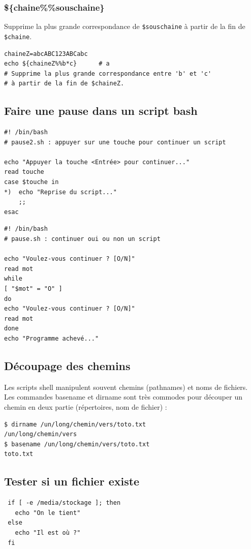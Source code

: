 \documentclass[a4paper,twoside]{article}
\begin{document}
\subsubsection{\$\{chaine\%\%souschaine\}}
Supprime la plus grande correspondance de \verb|$souschaine| à partir de la fin de \verb|$chaine|.

\begin{exemple}
\begin{verbatim}
chaineZ=abcABC123ABCabc
echo ${chaineZ%%b*c}      # a
# Supprime la plus grande correspondance entre 'b' et 'c'
# à partir de la fin de $chaineZ.
\end{verbatim}
\end{exemple}

\subsection{Faire une pause dans un script bash}
\begin{verbatim}
#! /bin/bash
# pause2.sh : appuyer sur une touche pour continuer un script

echo "Appuyer la touche <Entrée> pour continuer..."
read touche
case $touche in
*)	echo "Reprise du script..."
	;;
esac
\end{verbatim}

\begin{verbatim}
#! /bin/bash
# pause.sh : continuer oui ou non un script

echo "Voulez-vous continuer ? [O/N]"
read mot
while
[ "$mot" = "O" ]
do
echo "Voulez-vous continuer ? [O/N]"
read mot
done
echo "Programme achevé..."
\end{verbatim}

\subsection{Découpage des chemins}
Les scripts shell manipulent souvent chemins (pathnames) et noms de fichiers. Les commandes basename et dirname sont très commodes pour découper un chemin en deux partie (répertoires, nom de fichier) :
\begin{verbatim}
$ dirname /un/long/chemin/vers/toto.txt
/un/long/chemin/vers
$ basename /un/long/chemin/vers/toto.txt
toto.txt
\end{verbatim}


\subsection{Tester si un fichier existe}
\begin{verbatim}
 if [ -e /media/stockage ]; then
   echo "On le tient"
 else
   echo "Il est où ?"
 fi
\end{verbatim}
\end{document}
